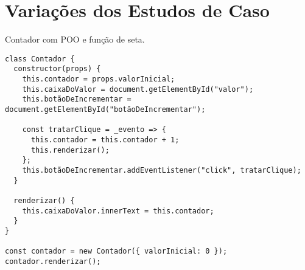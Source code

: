 \chapter{Variações dos Estudos de Caso}
\label{apend:1}

\begin{listing}[htbp]
\caption{\label{code:contadorComPOOeFuncDeSeta}Contador com POO e função de seta.}
\begin{verbatim}
class Contador {
  constructor(props) {
    this.contador = props.valorInicial;
    this.caixaDoValor = document.getElementById("valor");
    this.botãoDeIncrementar = document.getElementById("botãoDeIncrementar");

    const tratarClique = _evento => {
      this.contador = this.contador + 1;
      this.renderizar();
    };
    this.botãoDeIncrementar.addEventListener("click", tratarClique);
  }

  renderizar() {
    this.caixaDoValor.innerText = this.contador;
  }
}

const contador = new Contador({ valorInicial: 0 });
contador.renderizar();
\end{verbatim}
\end{listing}